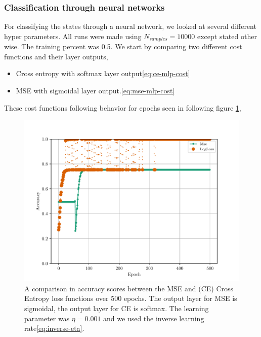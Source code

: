 \subsubsection{Classification through neural networks}
For classifying the states through a neural network, we looked at several different hyper parameters. All runs were made using $N_{samples}=10000$ except stated other wise. The training percent was 0.5. We start by comparing two different cost functions and their layer outputs,
\begin{itemize}
    \item Cross entropy with softmax layer output\eqref{eq:ce-mlp-cost}
    \item MSE with sigmoidal layer output.\eqref{eq:mse-mlp-cost}
\end{itemize}
These cost functions following behavior for epochs seen in following figure \ref{fig:mlp-cost-function-comparison},
\begin{figure}[H]
    \centering
    \includegraphics[scale=1.0]{../fig/mlp_epoch_cost_functions.pdf}
    \caption{A comparison in accuracy scores between the MSE and (CE) Cross Entropy loss functions over 500 epochs. The output layer for MSE is sigmoidal, the output layer for CE is softmax. The learning parameter was $\eta=0.001$ and we used the inverse learning rate\eqref{eq:inverse-eta}.}
    \label{fig:mlp-cost-function-comparison}
\end{figure}

